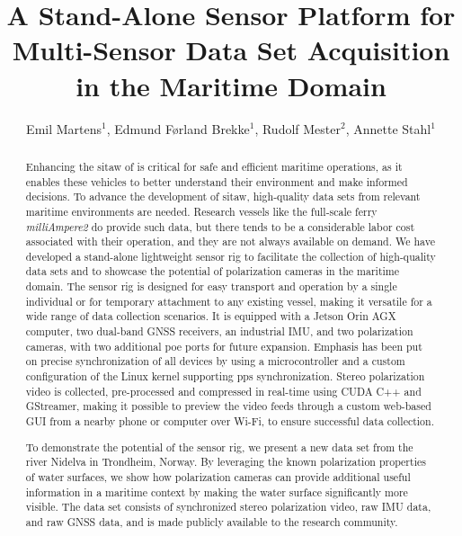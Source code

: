 \documentclass{iopconfser}
\begin{document}
\title{A Stand-Alone Sensor Platform for Multi-Sensor Data Set Acquisition in the Maritime Domain}

\author{Emil Martens$^{1}$, Edmund Førland Brekke$^{1}$, Rudolf Mester$^{2}$, Annette Stahl$^{1}$}




\begin{abstract}
    \justifying 
    Enhancing the \gls{sitaw} of  is critical for safe and efficient maritime operations, as it enables these vehicles to better understand their environment and make informed decisions.
    To advance the development of \gls{sitaw}, high-quality data sets from relevant maritime environments are needed.
    Research vessels like the full-scale ferry \textit{milliAmpere2} do provide such data, but there tends to be a considerable labor cost associated with their operation, and they are not always available on demand.
    We have developed a stand-alone lightweight sensor rig to facilitate the collection of high-quality data sets and to showcase the potential of polarization cameras in the maritime domain.
    The sensor rig is designed for easy transport and operation by a single individual or for temporary attachment to any existing vessel, making it versatile for a wide range of data collection scenarios.
    It is equipped with a Jetson Orin AGX computer, two dual-band GNSS receivers, an industrial IMU, and two polarization cameras, with two additional \gls{poe} ports for future expansion.
    Emphasis has been put on precise synchronization of all devices by using a microcontroller and a custom configuration of the Linux kernel supporting \gls{pps} synchronization.
    Stereo polarization video is collected, pre-processed and compressed in real-time using CUDA C++ and GStreamer, making it possible to preview the video feeds through a custom web-based GUI from a nearby phone or computer over Wi-Fi, to ensure successful data collection.
    
    To demonstrate the potential of the sensor rig, we present a new data set from the river Nidelva in Trondheim, Norway. 
    By leveraging the known polarization properties of water surfaces, we show how polarization cameras can provide additional useful information in a maritime context by making the water surface significantly more visible.
    The data set consists of synchronized stereo polarization video, raw IMU data, and raw GNSS data, and is made publicly available to the research community.
    
    
\end{abstract}
\end{document}
